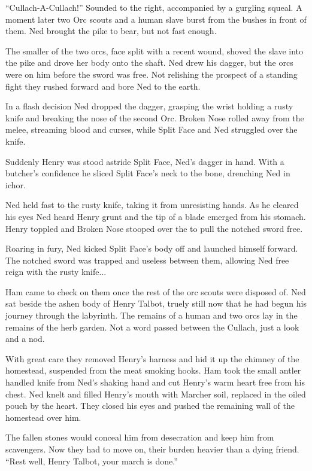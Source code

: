 “Cullach-A-Cullach!” Sounded to the right, accompanied by a gurgling squeal. A moment later two Orc scouts and a human slave burst from the bushes in front of them. Ned brought the pike to bear, but not fast enough.

The smaller of the two orcs, face split with a recent wound, shoved the slave into the pike and drove her body onto the shaft. Ned drew his dagger, but the orcs were on him before the sword was free. Not relishing the prospect of a standing fight they rushed forward and bore Ned to the earth.

In a flash decision Ned dropped the dagger, grasping the wrist holding a rusty knife and breaking the nose of the second Orc. Broken Nose rolled away from the melee, streaming blood and curses, while Split Face and Ned struggled over the knife.

Suddenly Henry was stood astride Split Face, Ned's dagger in hand. With a butcher's confidence he sliced Split Face's neck to the bone, drenching Ned in ichor.

Ned held fast to the rusty knife, taking it from unresisting hands. As he cleared his eyes Ned heard Henry grunt and the tip of a blade emerged from his stomach. Henry toppled and Broken Nose stooped over the to pull the notched sword free.

Roaring in fury, Ned kicked Split Face's body off and launched himself forward. The notched sword was trapped and useless between them, allowing Ned free reign with the rusty knife...

Ham came to check on them once the rest of the orc scouts were disposed of. Ned sat beside the ashen body of Henry Talbot, truely still now that he had begun his journey through the labyrinth. The remains of a human and two orcs lay in the remains of the herb garden. Not a word passed between the Cullach, just a look and a nod.

With great care they removed Henry's harness and hid it up the chimney of the homestead, suspended from the meat smoking hooks. Ham took the small antler handled knife from Ned's shaking hand and cut Henry's warm heart free from his chest. Ned knelt and filled Henry's mouth with Marcher soil, replaced in the oiled pouch by the heart. They closed his eyes and pushed the remaining wall of the homestead over him.

The fallen stones would conceal him from desecration and keep him from scavengers. Now they had to move on, their burden heavier than a dying friend.
“Rest well, Henry Talbot, your march is done.”

